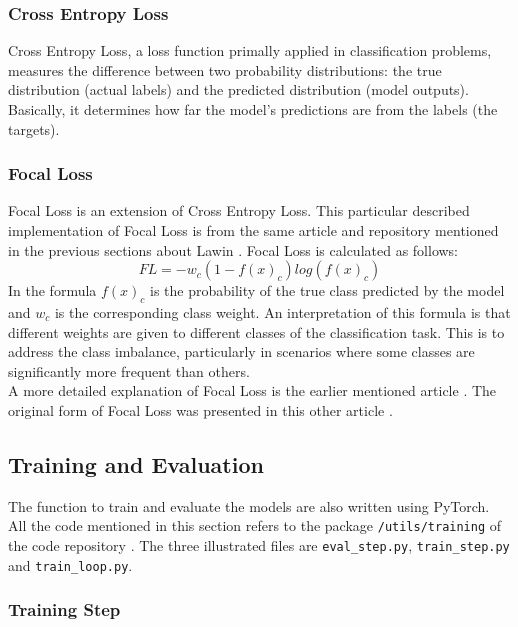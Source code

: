 \subsubsection{Cross Entropy Loss}

Cross Entropy Loss, a loss function primally applied in classification problems, measures the difference between two probability distributions: the true distribution (actual labels) and the predicted distribution (model outputs).
Basically, it determines how far the model's predictions are from the labels (the targets).

\subsubsection{Focal Loss}

Focal Loss is an extension of Cross Entropy Loss. This particular described implementation of Focal Loss is from the same article and repository mentioned in the previous sections about Lawin \cite{WeedMap-PaperThesis} \cite{WeedMap-Repository}.
Focal Loss is calculated as follows:
\begin{equation}
	FL=-w_c (1-f(x)_c ) log(f(x)_c)
\end{equation}
In the formula $f(x)_c$ is the probability of the true class predicted by the model and $w_c$ is the corresponding class weight.
An interpretation of this formula is that different weights are given to different classes of the classification task. This is to address the class imbalance, particularly in scenarios where some classes are significantly more frequent than others.
\\[0.3cm]A more detailed explanation of Focal Loss is the earlier mentioned article \cite{WeedMap-PaperThesis}. The original form of Focal Loss was presented in this other article \cite{FocalLoss}.

\subsection{Training and Evaluation}

The function to train and evaluate the models are also written using PyTorch.
\\[0.3cm]All the code mentioned in this section refers to the package \texttt{/utils/training} of the code repository \cite{Repository-THESIS}. The three illustrated files are \texttt{eval\_step.py}, \texttt{train\_step.py} and \texttt{train\_loop.py}.

\subsubsection{Training Step}

